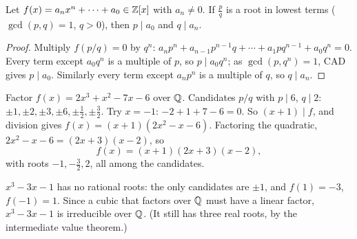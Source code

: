 \begin{theorem}
Let $f(x) = a_nx^n + \cdots + a_0 \in \mathbb{Z}[x]$ with $a_n \ne 0$. If $\frac pq$ is a root in lowest
terms ($\gcd(p,q) = 1$, $q > 0$), then $p \mid a_0$ and $q \mid a_n$.
\end{theorem}
\begin{proof}
Multiply $f(p/q) = 0$ by $q^n$:
$a_np^n + a_{n-1}p^{n-1}q + \cdots + a_1pq^{n-1} + a_0q^n = 0$. Every term except $a_0q^n$ is a
multiple of $p$, so $p \mid a_0q^n$; as $\gcd(p,q^n) = 1$, CAD gives $p \mid a_0$. Similarly every
term except $a_np^n$ is a multiple of $q$, so $q \mid a_n$.
\end{proof}

\begin{example}
Factor $f(x) = 2x^3 + x^2 - 7x - 6$ over $\mathbb{Q}$.
Candidates $p/q$ with $p \mid 6$, $q \mid 2$: $\pm1, \pm2, \pm3,\pm6,\pm\frac12,\pm\frac32$.
Try $x = -1$: $-2 + 1 + 7 - 6 = 0$. So $(x + 1) \mid f$, and division gives
$f(x) = (x+1)(2x^2 - x - 6)$. Factoring the quadratic, $2x^2 - x - 6 = (2x + 3)(x - 2)$, so
\[ f(x) = (x + 1)(2x + 3)(x - 2), \]
with roots $-1, -\frac32, 2$, all among the candidates.
\end{example}

\begin{center}
\end{center}

\begin{example}
$x^3 - 3x - 1$ has no rational roots: the only candidates are $\pm1$, and $f(1) = -3$,
$f(-1) = 1$. Since a cubic that factors over $\mathbb{Q}$ must have a linear factor, $x^3 - 3x - 1$ is
irreducible over $\mathbb{Q}$. (It still has three real roots, by the intermediate value theorem.)
\end{example}

